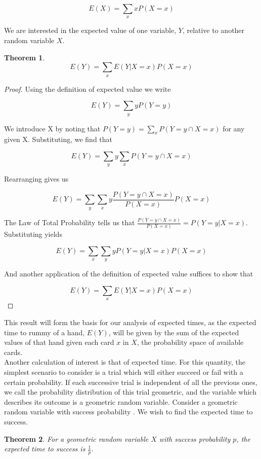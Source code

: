\documentclass[letter,12pt]{article}
\newtheorem{theorem}{Theorem}
\begin{document}
$$E(X) = \sum_{x} x P(X = x)$$

We are interested in the expected value of one variable, $Y$, relative to another random variable $X$.

\begin{theorem}

$$E(Y) = \sum_{x} E(Y | X = x) P(X = x)$$
\end{theorem}

\begin{proof}
Using the definition of expected value we write

$$E(Y) = \sum_{y} y P(Y = y)$$

We introduce X by noting that $P(Y=y)=\sum_{x} P(Y=y \cap X = x) $ for any given X. Substituting, we find that

$$E(Y) = \sum_{y} y \sum_{x} P(Y = y \cap X = x)$$

Rearranging gives us

$$E(Y) = \sum_{y} \sum_{x} y \frac{P(Y = y \cap X = x)}{P(X=x)} P(X=x)$$

The Law of Total Probability tells us that $\frac{P(Y=y \cap X=x)}{P(X=x)} = P(Y=y | X=x)$. Substituting yields

$$E(Y) = \sum_{x} \sum_{y} y P(Y=y | X=x) P(X=x) $$

And another application of the definition of expected value suffices to show that

$$E(Y) =  \sum_{x} E(Y | X = x) P(X = x)$$

\end{proof}

This result will form the basis for our analysis of expected times, as the expected time to rummy of a hand, $E(Y)$, will be given by the sum of the expected values of that hand given each card $x$ in $X$, the probability space of available cards. \\

Another calculation of interest is that of expected time. For this quantity, the simplest scenario to consider is a trial which will either succeed or fail with a certain probability. If each successive trial is independent of all the previous ones, we call the probability distribution of this trial geometric, and the variable which describes its outcome is a geometric random variable. Consider a geometric random variable with success probability . We wish to find the expected time to success.\\

\begin{theorem}
For a geometric random variable $X$ with success probability $p$, the expected time to success is $\frac{1}{p}$. 
\end{theorem}
\end{document}
